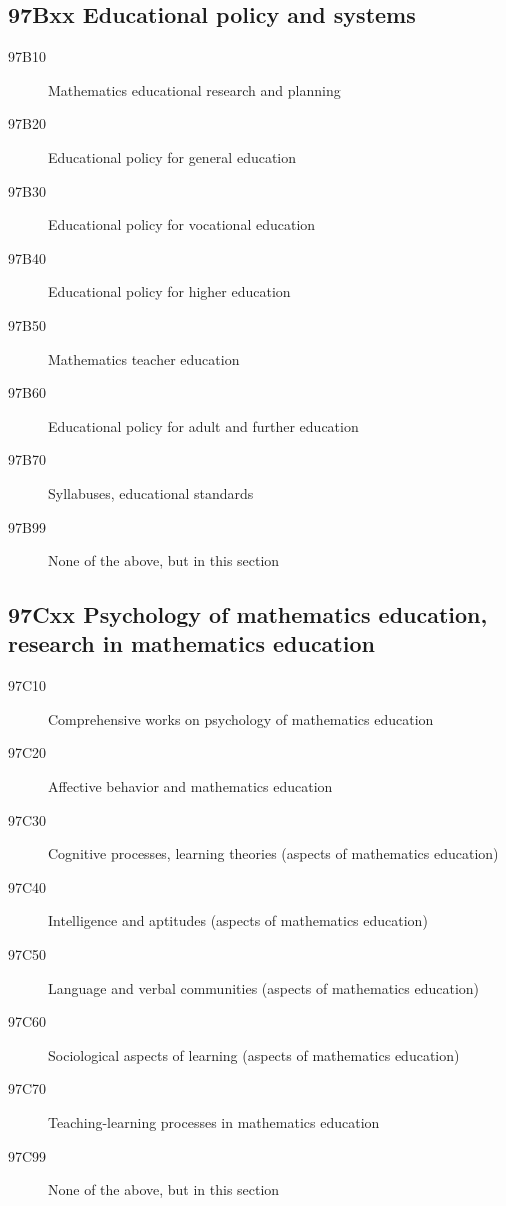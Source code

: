 \documentclass[letterpaper]{article}
\begin{document}
\subsection*{97Bxx  Educational policy and systems }\label{97Bxx}
\begin{description}  
\item [97B10]\label{97B10} Mathematics educational research and planning
\item [97B20]\label{97B20} Educational policy for general education
\item [97B30]\label{97B30} Educational policy for vocational education
\item [97B40]\label{97B40} Educational policy for higher education
\item [97B50]\label{97B50} Mathematics teacher education
\item [97B60]\label{97B60} Educational policy for adult and further education
\item [97B70]\label{97B70} Syllabuses, educational standards
\item [97B99]\label{97B99} None of the above, but in this section
\end{description}
\subsection*{97Cxx  Psychology of mathematics education, research in mathematics education }\label{97Cxx}
\begin{description}  
\item [97C10]\label{97C10} Comprehensive works on psychology of mathematics education
\item [97C20]\label{97C20} Affective behavior and mathematics education
\item [97C30]\label{97C30} Cognitive processes, learning theories (aspects of mathematics education)
\item [97C40]\label{97C40} Intelligence and aptitudes (aspects of mathematics education)
\item [97C50]\label{97C50} Language and verbal communities (aspects of mathematics education)
\item [97C60]\label{97C60} Sociological aspects of learning (aspects of mathematics education)
\item [97C70]\label{97C70} Teaching-learning processes in mathematics education
\item [97C99]\label{97C99} None of the above, but in this section
\end{description}
\end{document}
